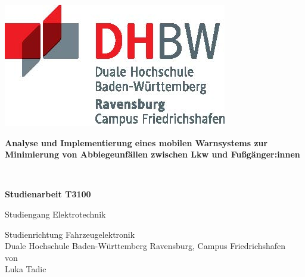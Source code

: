 \documentclass[openany]{scrbook} %
\newcommand{\titel}{Analyse und Implementierung eines mobilen Warnsystems zur Minimierung von Abbiegeunfällen zwischen Lkw und Fußgänger:innen}
\newcommand{\untertitel}{}
\newcommand{\arbeit}{Studienarbeit T3100}
\newcommand{\studiengang}{Elektrotechnik}
\newcommand{\studienrichtung}{Fahrzeugelektronik}
\newcommand{\autor}{Luka Tadic}
\begin{document}
\thispagestyle{plain}
\hypersetup{pageanchor=false}

\begin{titlepage}
\enlargethispage{4.0cm}
\sffamily  %

\parbox{0.5\linewidth}{
    \begin{flushleft}
    \end{flushleft}
}
\parbox{0.5\linewidth}{
    \begin{flushright}
        \includegraphics[width=0.4\linewidth]{images/DHBW_d_R_FN_46mm_4c}\\[5ex]
    \end{flushright}
}

\begin{center}

{\fontsize{20.74pt}{24pt}\selectfont
\textbf{\titel}\\[1.5ex]}

{\fontsize{14pt}{17pt}\selectfont
\textbf{\untertitel}\\[5ex]}

{\fontsize{17pt}{20pt}\selectfont
\textbf{\arbeit}\\[2ex]}

{\fontsize{14pt}{17pt}\selectfont
Studiengang \studiengang\\[2ex]}

{\fontsize{12pt}{14pt}\selectfont
Studienrichtung \studienrichtung\\[1ex]
Duale Hochschule Baden-Württemberg Ravensburg, Campus Friedrichshafen\\[5ex]
von\\[1ex]
\autor\\[15ex]}

\end{center}


\end{titlepage}
\end{document}
